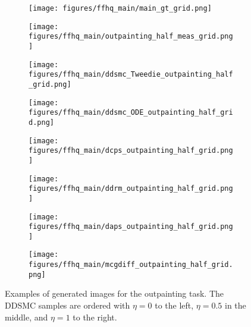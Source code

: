 \begin{figure*}[h]
    \centering
    \begin{subfigure}[t]{0.083\linewidth}
        \centering
        \texttt{[image: figures/ffhq\_main/main\_gt\_grid.png]}
    \end{subfigure}%
    \hfill
    \begin{subfigure}[t]{0.083\linewidth}
        \centering
        \texttt{[image: figures/ffhq\_main/outpainting\_half\_meas\_grid.png]}
    \end{subfigure}%
    \hfill
    \begin{subfigure}[t]{0.25\linewidth}
        \centering
        \texttt{[image: figures/ffhq\_main/ddsmc\_Tweedie\_outpainting\_half\_grid.png]}
    \end{subfigure}%
    \hfill
    \begin{subfigure}[t]{0.25\linewidth}
        \centering
        \texttt{[image: figures/ffhq\_main/ddsmc\_ODE\_outpainting\_half\_grid.png]}
    \end{subfigure}%
    \hfill
    \begin{subfigure}[t]{0.083\linewidth}
        \centering
        \texttt{[image: figures/ffhq\_main/dcps\_outpainting\_half\_grid.png]}
    \end{subfigure}%
    \begin{subfigure}[t]{0.083\linewidth}
        \centering
        \texttt{[image: figures/ffhq\_main/ddrm\_outpainting\_half\_grid.png]}
    \end{subfigure}%
    \begin{subfigure}[t]{0.083\linewidth}
        \centering
        \texttt{[image: figures/ffhq\_main/daps\_outpainting\_half\_grid.png]}
    \end{subfigure}%
    \begin{subfigure}[t]{0.083\linewidth}
        \centering
        \texttt{[image: figures/ffhq\_main/mcgdiff\_outpainting\_half\_grid.png]}
    \end{subfigure}%
\caption{Examples of generated images for the outpainting task. The DDSMC samples are ordered with $\eta=0$ to the left, $\eta=0.5$ in the middle, and $\eta=1$ to the right. }
\label{fig:ffhq_main}
\end{figure*}
